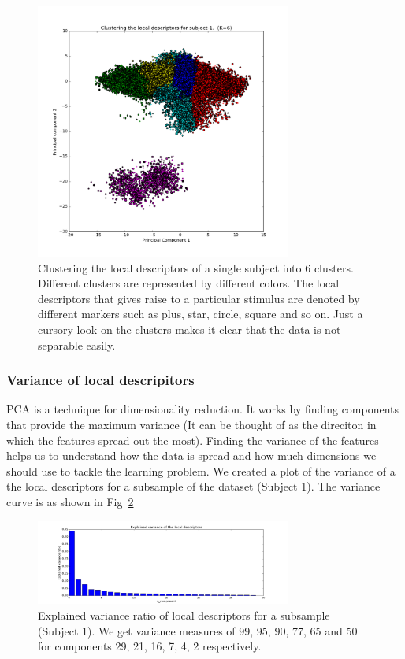 \documentclass[final,leqno,onefignum,onetabnum]{siamltexmm}
\begin{document}
\begin{figure}
  \centering
  \includegraphics[width=0.75\textwidth]{images/cluster_centers}
  \caption{Clustering the local descriptors of a single subject into 6 clusters.  Different clusters are represented by different colors.  The local descriptors that gives raise to a particular stimulus are denoted by different markers such as plus, star, circle, square and so on.  Just a cursory look on the clusters makes it clear that the data is not separable easily.\label{fig:local_descriptors_clusters}} 
\end{figure}

\subsubsection{Variance of local descripitors}
PCA is a technique for dimensionality reduction.  
It works by finding components that provide the maximum variance (It can be thought of as the direciton in which the features spread out the most).
Finding the variance of the features helps us to understand how the data is spread and how much dimensions we should use to tackle the learning problem.  
We created a plot of the variance of a the local descriptors for a subsample of the dataset (Subject 1).  
The variance curve is as shown in Fig~\ref{fig:ld_variance}

\begin{figure}
  \centering
  \includegraphics[width=0.75\textwidth]{images/ld_variance}
  \caption{Explained variance ratio of local descriptors for a subsample (Subject 1).  We get variance measures of 99, 95, 90, 77, 65 and 50 for components 29, 21, 16, 7, 4, 2 respectively.\label{fig:ld_variance}} 
\end{figure}
\end{document}
